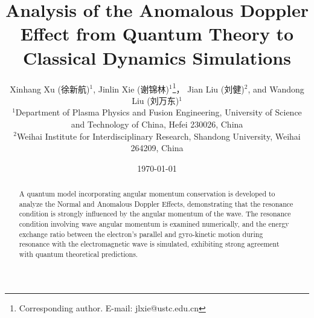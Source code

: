 \documentclass{cpbtex3}
\begin{document}
\title{Analysis of the Anomalous Doppler Effect from Quantum Theory to Classical Dynamics Simulations}



\author{
Xinhang Xu (徐新航)$^{1}$, 
Jinlin Xie (谢锦林)$^{1}$\thanks{Corresponding author. E-mail: jlxie@ustc.edu.cn}，
Jian Liu (刘健)$^{2}$, 
and Wandong Liu (刘万东)$^{1}$\\
$^{1}$Department of Plasma Physics and Fusion Engineering, University of Science and Technology of China, Hefei 230026, China \\
$^{2}$Weihai Institute for Interdisciplinary Research, Shandong University, Weihai 264209, China
}

\date{\today}
\maketitle

\begin{abstract}
A quantum model incorporating angular momentum conservation is developed to analyze the Normal and Anomalous Doppler Effects, demonstrating that the resonance condition is strongly influenced by the angular momentum of the wave. The resonance condition involving wave angular momentum is examined numerically, and the energy exchange ratio between the electron's parallel and gyro-kinetic motion during resonance with the electromagnetic wave is simulated, exhibiting strong agreement with quantum theoretical predictions.
\end{abstract}
\end{document}

